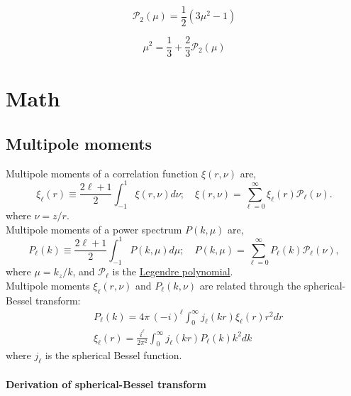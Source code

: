 \documentclass[a4paper,11pt, fleqn]{article}
\begin{document}
\clearpage
\begin{equation}
  \mathcal{P}_2(\mu) = \frac{1}{2}\left( 3 \mu^2 - 1 \right)
\end{equation}

\begin{equation}
  \mu^2 = \frac{1}{3} + \frac{2}{3} \mathcal{P}_2(\mu)
\end{equation}


\clearpage
\section{Math}

\subsection{Multipole moments}

Multipole moments of a correlation function $\xi(r,\nu)$ are,
\begin{equation}
  \xi_\ell(r) \equiv \frac{2 \ell + 1}{2} \int_{-1}^1 \xi(r, \nu) d\nu;\quad
  \xi(r, \nu) = \sum_{\ell=0}^\infty \xi_\ell(r) \mathcal{P}_\ell(\nu).
\end{equation}
where $\nu = z/r$.\\

Multipole moments of a power spectrum $P(k, \mu)$ are,
\begin{equation}
  P_\ell(k) \equiv \frac{2 \ell + 1}{2} \int_{-1}^1 P(k, \mu) d\mu;\quad
  P(k, \mu) = \sum_{\ell=0}^\infty P_\ell(k) \mathcal{P}_\ell(\nu),
\end{equation}
where $\mu = k_z/k$, and $\mathcal{P}_\ell$ is the \hyperref[sec:legendre]{Legendre polynomial}.\\

\vspace{5mm} Multipole moments $\xi_\ell(r, \nu)$ and $P_\ell(k, \nu)$
are related through the spherical-Bessel transform:
%
\begin{align}
  &P_\ell(k) = 4\pi \, (-i)^\ell \!\int_0^\infty \! j_\ell(kr) \xi_\ell(r) r^2 dr
  \label{eq:spherical-bessel-dr}\\
  &\xi_\ell(r) = \frac{i^\ell}{2\pi^2} \int_0^\infty \! j_\ell(kr) P_\ell(k) k^2 dk
  \label{eq:spherical-bessel-dk}
\end{align}
%
where $j_\ell$ is the spherical Bessel function.

\clearpage

\paragraph{Derivation of spherical-Bessel transform} \quad\\
\label{proof:multipole-transform}
\end{document}
